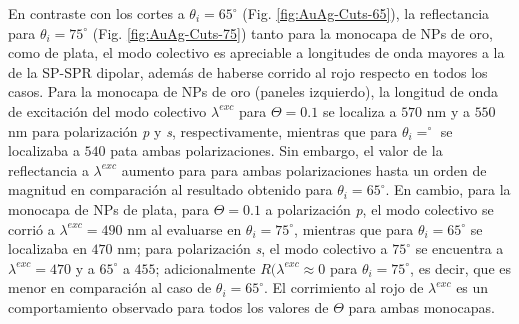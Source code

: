 En contraste con los cortes a $\theta_i=65^\circ$ (Fig. \ref{fig:AuAg-Cuts-65}), la reflectancia para $\theta_i=75^\circ$ (Fig. \ref{fig:AuAg-Cuts-75}) tanto para la monocapa de NPs de oro, como de plata, el modo colectivo es apreciable a longitudes de onda mayores a la de la SP-SPR dipolar, además de haberse corrido al rojo respecto en todos los casos. Para la monocapa de NPs de oro (paneles izquierdo), la longitud de onda de excitación del modo colectivo $\lambda^{exc}$ para $\Theta=0.1$ se localiza a $570$ nm y a $550$ nm para polarización \emph{p} y \emph{s}, respectivamente, mientras que para $\theta_i=^\circ$ se localizaba a $540$ pata ambas polarizaciones. Sin embargo, el valor de la reflectancia a $\lambda^{exc}$ aumento para para ambas polarizaciones hasta un orden de magnitud en comparación al resultado obtenido para $\theta_i=65^\circ$. En cambio, para la monocapa de NPs de plata, para $\Theta=0.1$ a polarización \emph{p}, el modo colectivo se corrió a $\lambda^{exc}=490$ nm al evaluarse en $\theta_i=75^\circ$, mientras que para $\theta_i=65^\circ$ se localizaba en $470$ nm; para polarización \emph{s}, el modo colectivo a $75^\circ$ se encuentra a $\lambda^{exc}=470$ y a $65^\circ$ a $455$; adicionalmente $R(\lambda^{exc}\approx 0$ para $\theta_i=75^\circ$, es decir, que es menor en comparación al caso de $\theta_i=65^\circ$. El corrimiento al rojo de $\lambda^{exc}$ es un comportamiento observado para todos los valores de $\Theta$ para ambas monocapas.

